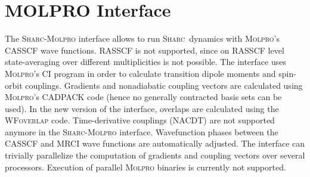 \documentclass[a4paper,10pt,DIV=15,openany]{scrbook}
\newcommand{\sharc}{\textsc{Sharc}}
\newcommand{\todo}[1]{\textcolor{RL}{#1}}
\begin{document}
% 
% 
% 
% 




\section{MOLPRO Interface}\label{sec:int:molpro}

The \sharc-\textsc{Molpro} interface allows to run \sharc\ dynamics with \textsc{Molpro}'s CASSCF wave functions. RASSCF is not supported, since on RASSCF level state-averaging over different multiplicities is not possible. The interface uses \textsc{Molpro}'s CI program in order to calculate transition dipole moments and spin-orbit couplings. Gradients and nonadiabatic coupling vectors are calculated using \textsc{Molpro}'s CADPACK code (hence no generally contracted basis sets can be used). In the new version of the interface, overlaps are calculated using the \textsc{WFoverlap} code. 
Time-derivative couplings (NACDT) are not supported anymore in the \sharc-\textsc{Molpro} interface.
Wavefunction phases between the CASSCF and MRCI wave functions are automatically adjusted.
The interface can trivially parallelize the computation of gradients and coupling vectors over several processors.
Execution of parallel \textsc{Molpro} binaries is currently not supported.
\end{document}
